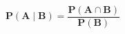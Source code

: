 \documentclass[12pt,portrait,semhelv,semrot]{article}
\begin{document}
\normalsize


$$\boldsymbol{P(A \mid B)  = \frac{P(A \cap B)}{P(B)} }$$
\end{document}
